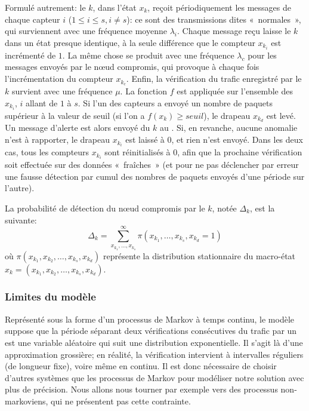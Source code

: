 \bigskip
Formulé autrement: le \cn $k$, dans l'état $x_k$, reçoit périodiquement les messages de chaque capteur $i$ ($1\leq i\leq s, i\!\neq\!s$): ce sont des transmissions dites «~normales~», qui surviennent avec une fréquence moyenne $\lambda_i$.
Chaque message reçu laisse le \cn $k$ dans un état presque identique, à la seule différence que le compteur $x_{k_i}$ est incrémenté de $1$.
La même chose se produit avec une fréquence $\lambda_c$ pour les messages envoyés par le nœud compromis, qui provoque à chaque fois l'incrémentation du compteur $x_{k_c}$.
Enfin, la vérification du trafic enregistré par le \cn $k$ survient avec une fréquence $\mu$.
La fonction $f$ est appliquée sur l'ensemble des $x_{k_i}$, $i$ allant de $1$ à $s$.
Si l'un des capteurs a envoyé un nombre de paquets supérieur à la valeur de seuil (\cad si l'on a $f(x_k)\geq \mathit{seuil}$), le drapeau $x_{k_d}$ est levé.
Un message d'alerte est alors envoyé du \cn $k$ au \ch.
Si, en revanche, aucune anomalie n'est à rapporter, le drapeau $x_{k_i}$ est laissé à $0$, et rien n'est envoyé.
Dans les deux cas, tous les compteurs $x_{k_i}$ sont réinitialisés à $0$, afin que la prochaine vérification soit effectuée sur des données «~fraîches~» (et pour ne pas déclencher par erreur une fausse détection par cumul des nombres de paquets envoyés d'une période sur l'autre).

La probabilité de détection du nœud compromis par le \cn $k$, notée $\Delta_k$, est la suivante:
\[\Delta_k=\sum_{x_{k_1},\dots,x_{k_s}}^\infty\pi(x_{k_1},\dots,x_{k_s},x_{k_d}=1)\]
où $\pi(x_{k_1},x_{k_2},\dots,x_{k_{s}},x_{k_d})$ représente la distribution stationnaire du macro-état $x_k\!=\!(x_{k_1},x_{k_2},\dots,x_{k_{s}},x_{k_d})$.

        \subsubsection{Limites du modèle}
Représenté sous la forme d'un processus de Markov à temps continu, le modèle suppose que la période séparant deux vérifications consécutives du trafic par un \cn est une variable aléatoire qui suit une distribution exponentielle.
Il s'agit là d'une approximation grossière; en réalité, la vérification intervient à intervalles réguliers (de longueur fixe), voire même en continu.
Il est donc nécessaire de choisir d'autres systèmes que les processus de Markov pour modéliser notre solution avec plus de précision.
Nous allons nous tourner par exemple vers des processus non-markoviens, qui ne présentent pas cette contrainte.

